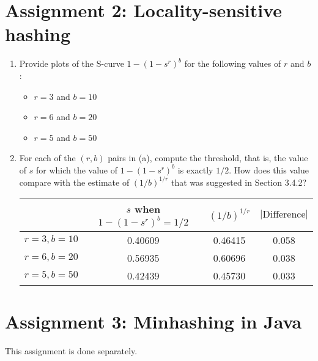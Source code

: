 \documentclass{article}
\begin{document}
\section{Assignment 2: Locality-sensitive hashing}
\begin{enumerate}
\item{Provide plots of the S-curve $1-(1-s^r)^b$ for the following values of $r$ and $b$:
	\begin{itemize}
		\item{$r=3$ and $b=10$
			
		}
		\item{$r=6$ and $b=20$
			
		}
		\item{$r=5$ and $b=50$
			
		}
	\end{itemize}
}

\item{For each of the $(r,b)$ pairs in (a), compute the threshold, that is, the value of $s$ for which the value of $1-(1-s^r)^b$ is exactly $1/2$. How does this value compare with the estimate of $(1/b)^{1/r}$ that was suggested in Section 3.4.2?

\begin{center}
	\begin{tabular}{ c | c | c | c }
		           & \makecell{$s$ when \\ $1-(1-s^r)^b=1/2$} & $(1/b)^{1/r}$ & $|\text{Difference}|$ \\ \hline\hline
		$r=3,b=10$ & 0.40609                                  & 0.46415       & 0.058                  \\
		$r=6,b=20$ & 0.56935                                  & 0.60696       & 0.038                  \\
		$r=5,b=50$ & 0.42439                                  & 0.45730       & 0.033
	\end{tabular}
\end{center}
}
\end{enumerate}

\section{Assignment 3: Minhashing in Java}
This assignment is done separately.
\end{document}
